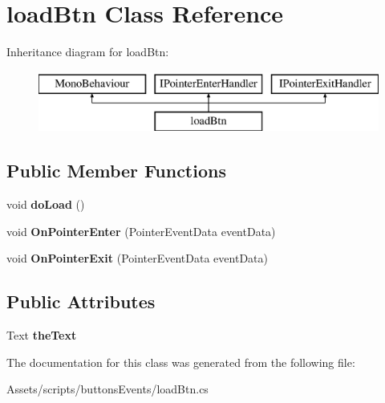 \hypertarget{classload_btn}{}\section{load\+Btn Class Reference}
\label{classload_btn}
Inheritance diagram for load\+Btn\+:\begin{figure}[H]
\begin{center}
\leavevmode
\includegraphics[height=2.000000cm]{classload_btn}
\end{center}
\end{figure}
\subsection*{Public Member Functions}
\begin{DoxyCompactItemize}
\item 
\mbox{\label{classload_btn_a0fe1262f3fac6936b6c00f16e392537c}} 
void {\bfseries do\+Load} ()
\item 
\mbox{\label{classload_btn_a04bdbf6ed6f0ce14b60d09d2173828db}} 
void {\bfseries On\+Pointer\+Enter} (Pointer\+Event\+Data event\+Data)
\item 
\mbox{\label{classload_btn_a0c30fd768c3558cbac9f37557665c259}} 
void {\bfseries On\+Pointer\+Exit} (Pointer\+Event\+Data event\+Data)
\end{DoxyCompactItemize}
\subsection*{Public Attributes}
\begin{DoxyCompactItemize}
\item 
\mbox{\label{classload_btn_a9ddffd0494944730e2ca5e43bffa6668}} 
Text {\bfseries the\+Text}
\end{DoxyCompactItemize}


The documentation for this class was generated from the following file\+:\begin{DoxyCompactItemize}
\item 
Assets/scripts/buttons\+Events/load\+Btn.\+cs\end{DoxyCompactItemize}
